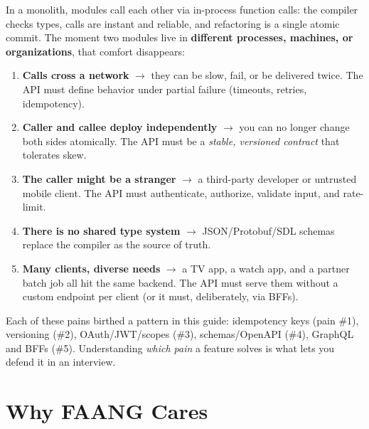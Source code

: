 \documentclass[11pt]{article}
\providecommand{\tightlist}{\setlength{\itemsep}{1pt}\setlength{\parskip}{0pt}}
\begin{document}
In a monolith, modules call each other via in-process function calls: the compiler checks types, calls are instant and reliable, and refactoring is a single atomic commit. The moment two modules live in \textbf{different processes, machines, or organizations}, that comfort disappears:

\begin{enumerate}
\def\labelenumi{\arabic{enumi}.}
\tightlist
\item
  \textbf{Calls cross a network} \(\rightarrow\) they can be slow, fail, or be delivered twice. The API must define behavior under partial failure (timeouts, retries, idempotency).
\item
  \textbf{Caller and callee deploy independently} \(\rightarrow\) you can no longer change both sides atomically. The API must be a \emph{stable, versioned contract} that tolerates skew.
\item
  \textbf{The caller might be a stranger} \(\rightarrow\) a third-party developer or untrusted mobile client. The API must authenticate, authorize, validate input, and rate-limit.
\item
  \textbf{There is no shared type system} \(\rightarrow\) JSON/Protobuf/SDL schemas replace the compiler as the source of truth.
\item
  \textbf{Many clients, diverse needs} \(\rightarrow\) a TV app, a watch app, and a partner batch job all hit the same backend. The API must serve them without a custom endpoint per client (or it must, deliberately, via BFFs).
\end{enumerate}

Each of these pains birthed a pattern in this guide: idempotency keys (pain \#1), versioning (\#2), OAuth/JWT/scopes (\#3), schemas/OpenAPI (\#4), GraphQL and BFFs (\#5). Understanding \emph{which pain} a feature solves is what lets you defend it in an interview.

\section{Why FAANG Cares}\label{why-faang-cares}
\end{document}
